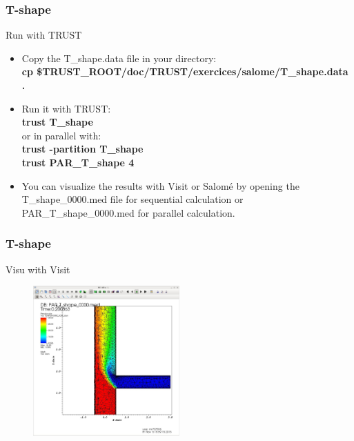 \documentclass[10pt, hyperref={unicode=true,pdfusetitle, bookmarks=true,bookmarksnumbered=false,bookmarksopen=false, breaklinks=false,pdfborder={0 0 1},backref=true,colorlinks=true,linkcolor=darkblue,pageanchor}]{beamer}
\begin{document}
\begin{frame}
\frametitle{T-shape}
\begin{block}{Run with TRUST}

\begin{itemize}
\item Copy the T\_shape.data file in your directory:\\
\textbf{cp \$TRUST\_ROOT/doc/TRUST/exercices/salome/T\_shape.data  .}

\item Run it with TRUST:\\
\textbf{trust T\_shape}\\
or in parallel with:\\
\textbf{trust -partition T\_shape}\\
\textbf{trust PAR\_T\_shape 4}\\

\item You can visualize the results with Visit or Salom\'e by opening the T\_shape\_0000.med file for sequential calculation or PAR\_T\_shape\_0000.med for parallel calculation.
\end{itemize}

\end{block}
\end{frame}
\begin{frame}
\frametitle{T-shape}
\begin{block}{Visu with Visit}

\begin{figure}
\includegraphics[width=0.5\textwidth]{PICTURES/salome18.jpg}
\end{figure}

\end{block}
\end{frame}
\end{document}
